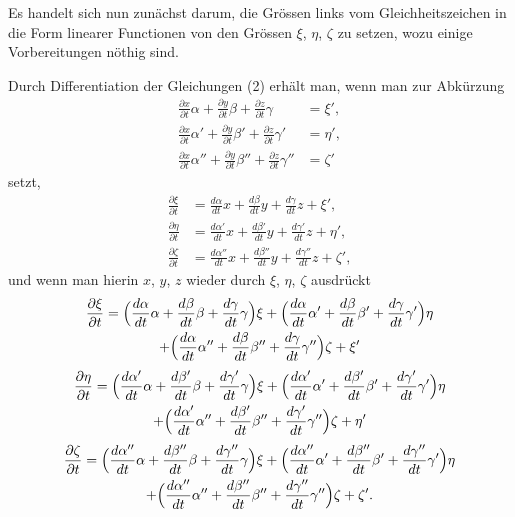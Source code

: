 \documentclass[12pt,a4paper]{book}
\theoremstyle{definition}
\theoremstyle{remark}
\begin{document}
Es handelt sich nun zunächst darum, die Grössen links vom Gleichheitszeichen in die Form linearer Functionen von den Grössen $\xi$, $\eta$, $\zeta$ zu setzen, wozu einige Vorbereitungen nöthig sind.

Durch Differentiation der Gleichungen (2) erhält man, wenn man zur Abkürzung
\begin{equation}
\tag{2}
\begin{aligned}
\frac{\partial x}{\partial t}\alpha + \frac{\partial y}{\partial t}\beta + \frac{\partial z}{\partial t}\gamma &= \xi',\\
\frac{\partial x}{\partial t}\alpha' + \frac{\partial y}{\partial t}\beta' + \frac{\partial z}{\partial t}\gamma' &= \eta',\\
\frac{\partial x}{\partial t}\alpha'' + \frac{\partial y}{\partial t}\beta'' + \frac{\partial z}{\partial t}\gamma'' &= \zeta'
\end{aligned}
\end{equation}
setzt,
\begin{align*}
\frac{\partial \xi}{\partial t} &= \frac{d\alpha}{dt}x + \frac{d\beta}{dt}y + \frac{d\gamma}{dt}z + \xi',\\
\frac{\partial \eta}{\partial t} &= \frac{d\alpha'}{dt}x + \frac{d\beta'}{dt}y + \frac{d\gamma'}{dt}z + \eta',\\
\frac{\partial \zeta}{\partial t} &= \frac{d\alpha''}{dt}x + \frac{d\beta''}{dt}y + \frac{d\gamma''}{dt}z + \zeta',
\end{align*}
und wenn man hierin $x$, $y$, $z$ wieder durch $\xi$, $\eta$, $\zeta$ ausdrückt
\begin{multline*}
\frac{\partial \xi}{\partial t} = \Bigl(\frac{d\alpha}{dt}\alpha + \frac{d\beta}{dt}\beta + \frac{d\gamma}{dt}\gamma\Bigr)\xi + \Bigl(\frac{d\alpha}{dt}\alpha' + \frac{d\beta}{dt}\beta' + \frac{d\gamma}{dt}\gamma'\Bigr)\eta\\
+ \Bigl(\frac{d\alpha}{dt}\alpha'' + \frac{d\beta}{dt}\beta'' + \frac{d\gamma}{dt}\gamma''\Bigr)\zeta + \xi'
\end{multline*}
\begin{multline*}
\frac{\partial \eta}{\partial t} = \Bigl(\frac{d\alpha'}{dt}\alpha + \frac{d\beta'}{dt}\beta + \frac{d\gamma'}{dt}\gamma\Bigr)\xi + \Bigl(\frac{d\alpha'}{dt}\alpha' + \frac{d\beta'}{dt}\beta' + \frac{d\gamma'}{dt}\gamma'\Bigr)\eta\\
+ \Bigl(\frac{d\alpha'}{dt}\alpha'' + \frac{d\beta'}{dt}\beta'' + \frac{d\gamma'}{dt}\gamma''\Bigr)\zeta + \eta'
\end{multline*}
\begin{multline*}
\frac{\partial \zeta}{\partial t} = \Bigl(\frac{d\alpha''}{dt}\alpha + \frac{d\beta''}{dt}\beta + \frac{d\gamma''}{dt}\gamma\Bigr)\xi + \Bigl(\frac{d\alpha''}{dt}\alpha' + \frac{d\beta''}{dt}\beta' + \frac{d\gamma''}{dt}\gamma'\Bigr)\eta\\
+ \Bigl(\frac{d\alpha''}{dt}\alpha'' + \frac{d\beta''}{dt}\beta'' + \frac{d\gamma''}{dt}\gamma''\Bigr)\zeta + \zeta'.
\end{multline*}
\end{document}
